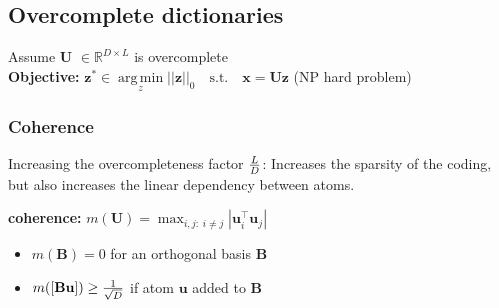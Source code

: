 \documentclass[a4paper,11pt]{article}
\newcommand{\argmin}{\operatorname*{arg\,min}}
\newcommand{\R}{\mathbb{R}}
\begin{document}
\begin{multicols}{2}
\subsection{Overcomplete dictionaries}
Assume \textbf{U} $\in \R^{D \times L}$ is overcomplete\\
\textbf{Objective:} 
$\mathbf{z}^* \in \argmin \limits_z ||\mathbf z||_0 \quad \text{s.t.}\quad \mathbf x = \mathbf U \mathbf z$ \hspace{0.3cm}(NP hard problem)

\subsubsection{Coherence}
Increasing the overcompleteness factor ${L \over D}$: Increases the sparsity of the coding, but also increases the linear dependency between atoms.

\vspace{0.1cm}
\textbf{coherence:} 
$m(\mathbf U) = \max_{i, j: \; i \neq j} | \mathbf u_i^\top \mathbf u_j |$
\begin{itemize}[leftmargin=0.5cm]
  \itemsep0em 
  \item $m(\mathbf B) = 0$ for an orthogonal basis $\mathbf B$
  \item $m([\mathbf B \mathbf u]) \geq {1 \over \sqrt{D}}$ if atom $\mathbf u$ added to $\mathbf B$
\end{itemize}


\end{multicols}
\end{document}
